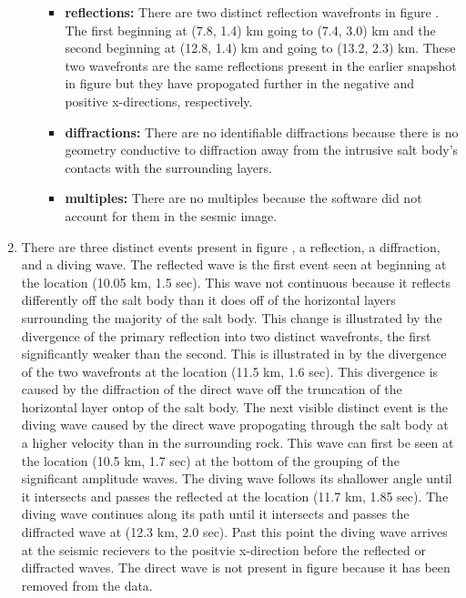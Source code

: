 \begin{enumerate}
\begin{enumerate}
\begin{itemize}
      \item \textbf{reflections:} There are two distinct reflection wavefronts in figure . The first beginning at (7.8, 1.4) km going to (7.4, 3.0) km and the second beginning at (12.8, 1.4) km and going to (13.2, 2.3) km. These two wavefronts are the same reflections present in the earlier snapshot in figure  but they have propogated further in the negative and positive x-directions, respectively.
      \item \textbf{diffractions:} There are no identifiable diffractions because there is no geometry conductive to diffraction away from the intrusive salt body's contacts with the surrounding layers.
      \item \textbf{multiples:} There are no multiples because the software did not account for them in the sesmic image.
    \end{itemize}
  \end{enumerate}
\item There are three distinct events present in figure , a reflection, a diffraction, and a diving wave. The reflected wave is the first event seen at beginning at the location (10.05 km, 1.5 sec). This wave not continuous because it reflects differently off the salt body than it does off of the horizontal layers surrounding the majority of the salt body. This change is illustrated by the divergence of the primary reflection into two distinct wavefronts, the first significantly weaker than the second. This is illustrated in  by the divergence of the two wavefronts at the location (11.5 km, 1.6 sec). This divergence is caused by the diffraction of the direct wave off the truncation of the horizontal layer ontop of the salt body. The next visible distinct event is the diving wave caused by the direct wave propogating through the salt body at a higher velocity than in the surrounding rock. This wave can first be seen at the location (10.5 km, 1.7 sec) at the bottom of the grouping of the significant amplitude waves. The diving wave follows its shallower angle until it intersects and passes the reflected at the location (11.7 km, 1.85 sec). The diving wave continues along its path until it intersects and passes the diffracted wave at (12.3 km, 2.0 sec). Past this point the diving wave arrives at the seismic recievers to the positvie x-direction before the reflected or diffracted waves. The direct wave is not present in figure  because it has been removed from the data.

\end{enumerate}
